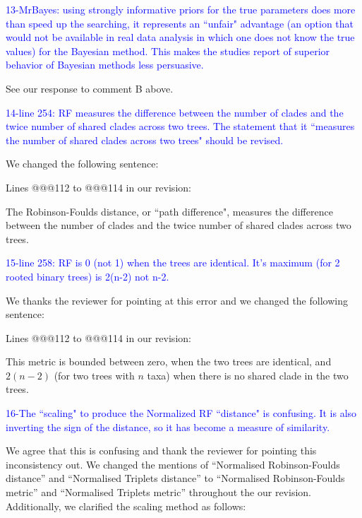 \documentclass[11pt]{letter}
\begin{document}
\begin{letter}{}

\textcolor{blue}{13-MrBayes: using strongly informative priors for the true parameters does more than speed up the searching, it represents an ``unfair" advantage (an option that would not be available in real data analysis in which one does not know the true values) for the Bayesian method. This makes the studies report of superior behavior of Bayesian methods less persuasive.}

See our response to comment B above.


\textcolor{blue}{14-line 254: RF measures the difference between the number of clades and the twice number of shared clades across two trees. The statement that it ``measures the number of shared clades across two trees" should be revised.}

We changed the following sentence: %

Lines @@@112 to @@@114 in our revision:

\hfill\begin{minipage}{\dimexpr\textwidth-1cm}
The Robinson-Foulds distance, or ``path difference", measures the difference between the number of clades and the twice number of shared clades across two trees.
\end{minipage}


\textcolor{blue}{15-line 258: RF is 0 (not 1) when the trees are identical. It's maximum (for 2 rooted binary trees) is 2(n-2) not n-2.}

We thanks the reviewer for pointing at this error and we changed the following sentence:

Lines @@@112 to @@@114 in our revision:

\hfill\begin{minipage}{\dimexpr\textwidth-1cm}
This metric is bounded between zero, when the two trees are identical, and $2(n-2)$ (for two trees with $n$ taxa) when there is no shared clade in the two trees.
\end{minipage}



\textcolor{blue}{16-The ``scaling" to produce the Normalized RF ``distance" is confusing. It is also inverting the sign of the distance, so it has become a measure of similarity.}

We agree that this is confusing and thank the reviewer for pointing this inconsistency out. We changed the mentions of ``Normalised Robinson-Foulds distance'' and ``Normalised Triplets distance'' to ``Normalised Robinson-Foulds metric'' and ``Normalised Triplets metric'' throughout the our revision. Additionally, we clarified the scaling method as follows:


\end{letter}
\end{document}
